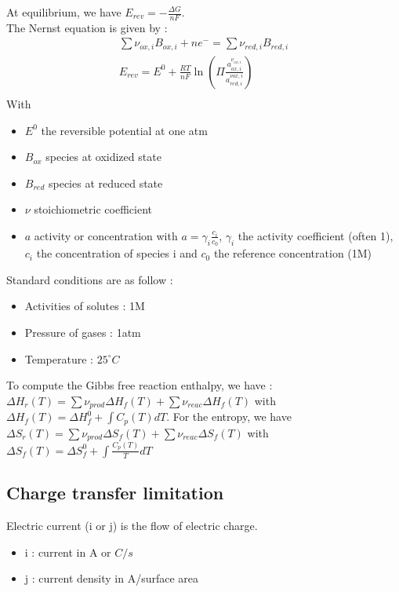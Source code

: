 \documentclass[../main.tex]{subfiles}
\begin{document}
At equilibrium, we have $E_{rev} = -\frac{\Delta G}{nF}$.\\
The Nernst equation is given by : \begin{equation}
    \begin{gathered}
        \sum \nu_{ox,i} B_{ox,i} + ne^- = \sum \nu_{red,i} B_{red,i}\\
        E_{rev} = E^0 + \frac{RT}{nF} \ln (\Pi \frac{a_{ox,i}^{\nu_{ox,i}}}{a_{red,i}^{\nu{ox,i}}})\\
    \end{gathered}
\end{equation}
With \begin{itemize}
    \item $E^0$ the reversible potential at one atm
    \item $B_{ox}$ species at oxidized state
    \item $B_{red}$ species at reduced state
    \item $\nu$ stoichiometric coefficient
    \item $a$ activity or concentration with $a= \gamma_i \frac{c_i}{c_0}$, $\gamma_i$ the activity coefficient (often 1), $c_i$ the concentration of species i and $c_0$ the reference concentration (1M)
\end{itemize}

Standard conditions are as follow : \begin{itemize}
    \item Activities of solutes : 1M
    \item Pressure of gases : 1atm
    \item Temperature : $25^\circ C$
\end{itemize}

To compute the Gibbs free reaction enthalpy, we have : $\Delta H_r(T) = \sum \nu_{prod} \Delta H_f(T) + \sum \nu_{reac} \Delta H_f(T)$ with $\Delta H_f(T) = \Delta H_f^0 + \int C_p(T)dT$. For the entropy, we have $\Delta S_r(T) = \sum \nu_{prod} \Delta S_f(T) + \sum \nu_{reac} \Delta S_f(T)$ with $\Delta S_f(T) = \Delta S_f^0 + \int \frac{C_p(T)}{T}dT$

\subsection{Charge transfer limitation}
Electric current (i or j) is the flow of electric charge. \begin{itemize}
    \item i : current in A or $C/s$
    \item j : current density in A/surface area
\end{itemize}
\end{document}
